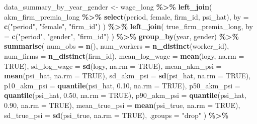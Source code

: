 \documentclass[
]{article}
\newenvironment{Shaded}{\begin{snugshade}}{\end{snugshade}}
\newcommand{\AttributeTok}[1]{\textcolor[rgb]{0.13,0.29,0.53}{#1}}
\newcommand{\ConstantTok}[1]{\textcolor[rgb]{0.56,0.35,0.01}{#1}}
\newcommand{\FloatTok}[1]{\textcolor[rgb]{0.00,0.00,0.81}{#1}}
\newcommand{\FunctionTok}[1]{\textcolor[rgb]{0.13,0.29,0.53}{\textbf{#1}}}
\newcommand{\NormalTok}[1]{#1}
\newcommand{\OtherTok}[1]{\textcolor[rgb]{0.56,0.35,0.01}{#1}}
\newcommand{\SpecialCharTok}[1]{\textcolor[rgb]{0.81,0.36,0.00}{\textbf{#1}}}
\newcommand{\StringTok}[1]{\textcolor[rgb]{0.31,0.60,0.02}{#1}}
\begin{document}
\begin{Shaded}
\begin{Highlighting}[]
\NormalTok{data\_summary\_by\_year\_gender }\OtherTok{\textless{}{-}}\NormalTok{ wage\_long }\SpecialCharTok{\%\textgreater{}\%}
    \FunctionTok{left\_join}\NormalTok{(}
\NormalTok{        akm\_firm\_premia\_long }\SpecialCharTok{\%\textgreater{}\%} \FunctionTok{select}\NormalTok{(period, female, firm\_id, psi\_hat),}
        \AttributeTok{by =} \FunctionTok{c}\NormalTok{(}\StringTok{"period"}\NormalTok{, }\StringTok{"female"}\NormalTok{, }\StringTok{"firm\_id"}\NormalTok{)}
\NormalTok{    ) }\SpecialCharTok{\%\textgreater{}\%}
    \FunctionTok{left\_join}\NormalTok{(}
\NormalTok{        true\_firm\_premia\_long,}
        \AttributeTok{by =} \FunctionTok{c}\NormalTok{(}\StringTok{"period"}\NormalTok{, }\StringTok{"gender"}\NormalTok{, }\StringTok{"firm\_id"}\NormalTok{)}
\NormalTok{    ) }\SpecialCharTok{\%\textgreater{}\%}
    \FunctionTok{group\_by}\NormalTok{(year, gender) }\SpecialCharTok{\%\textgreater{}\%}
    \FunctionTok{summarise}\NormalTok{(}
        \AttributeTok{num\_obs =} \FunctionTok{n}\NormalTok{(),}
        \AttributeTok{num\_workers =} \FunctionTok{n\_distinct}\NormalTok{(worker\_id),}
        \AttributeTok{num\_firms =} \FunctionTok{n\_distinct}\NormalTok{(firm\_id),}
        \AttributeTok{mean\_log\_wage =} \FunctionTok{mean}\NormalTok{(logy, }\AttributeTok{na.rm =} \ConstantTok{TRUE}\NormalTok{),}
        \AttributeTok{sd\_log\_wage =} \FunctionTok{sd}\NormalTok{(logy, }\AttributeTok{na.rm =} \ConstantTok{TRUE}\NormalTok{),}
        \AttributeTok{mean\_akm\_psi =} \FunctionTok{mean}\NormalTok{(psi\_hat, }\AttributeTok{na.rm =} \ConstantTok{TRUE}\NormalTok{),}
        \AttributeTok{sd\_akm\_psi =} \FunctionTok{sd}\NormalTok{(psi\_hat, }\AttributeTok{na.rm =} \ConstantTok{TRUE}\NormalTok{),}
        \AttributeTok{p10\_akm\_psi =} \FunctionTok{quantile}\NormalTok{(psi\_hat, }\FloatTok{0.10}\NormalTok{, }\AttributeTok{na.rm =} \ConstantTok{TRUE}\NormalTok{),}
        \AttributeTok{p50\_akm\_psi =} \FunctionTok{quantile}\NormalTok{(psi\_hat, }\FloatTok{0.50}\NormalTok{, }\AttributeTok{na.rm =} \ConstantTok{TRUE}\NormalTok{),}
        \AttributeTok{p90\_akm\_psi =} \FunctionTok{quantile}\NormalTok{(psi\_hat, }\FloatTok{0.90}\NormalTok{, }\AttributeTok{na.rm =} \ConstantTok{TRUE}\NormalTok{),}
        \AttributeTok{mean\_true\_psi =} \FunctionTok{mean}\NormalTok{(psi\_true, }\AttributeTok{na.rm =} \ConstantTok{TRUE}\NormalTok{),}
        \AttributeTok{sd\_true\_psi =} \FunctionTok{sd}\NormalTok{(psi\_true, }\AttributeTok{na.rm =} \ConstantTok{TRUE}\NormalTok{),}
        \AttributeTok{.groups =} \StringTok{"drop"}
\NormalTok{    ) }\SpecialCharTok{\%\textgreater{}\%}

\end{Highlighting}
\end{Shaded}
\end{document}
